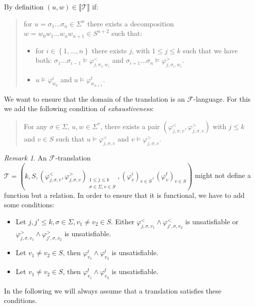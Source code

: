 \documentclass[12pt]{report}
\theoremstyle{definition}
\theoremstyle{remark}
\newtheorem{rmk}{Remark}[section]
\begin{document}
By definition $(u,w)\in\llbracket \mathcal T \rrbracket$ if:
\begin{quote}
for $u=\sigma_1\ldots \sigma_n\in \Sigma^n$ there exists a decomposition $w=w_0w_1\ldots w_nw_{n+1}\in S^{n+2}$ such that:
\begin{itemize}
\item for $i \in \left\{1,\ldots,n \right\}$ there exists $j$, with $1\leq j\leq k$ such that we have both:
$\sigma_1\ldots \sigma_{i-1}\models \varphi_{j,\sigma_i,w_i}^<$ and 
$\sigma_{i+1}\ldots \sigma_n\models \varphi_{j,\sigma_i,w_i}^>$.
\item $u\models \varphi_{w_0}^i$ and $u\models \varphi_{w_{n+1}}^t$.
\end{itemize}

\end{quote}

We want to ensure that the domain of the translation is an $\mathcal F$-language.
For this we add the following condition of \emph{exhaustiveness}:
\begin{quote}
For any $\sigma\in \Sigma$, $u,w\in \Sigma^\ast$, there exists a pair $\left(\varphi_{j,\sigma,v}^<,\varphi_{j,\sigma,v}^>\right)$ with $j\leq k$ and $v\in S$ such that $u\models \varphi_{j,\sigma,v}^<$ and $v\models \varphi_{j,\sigma,v}^>$.

\end{quote}

\begin{rmk}
An $\mathcal F$-translation $\mathcal T=\left(k,S,\left(\varphi_{j,\sigma,v}^<,\varphi_{j,\sigma,v}^>\right)_{\begin{smallmatrix} 1\leq j\leq k\\ \sigma \in \Sigma, v\in S \end{smallmatrix}},\left(\varphi_v^i\right)_{v\in S},\left(\varphi_v^t\right)_{v\in S}\right)$ might not define a function but a relation.
In order to ensure that it is functional, we have to add some conditions:
\begin{itemize}
\item Let $j,j'\leq k,\sigma\in \Sigma, v_1\neq v_2\in S$. Either $\varphi_{j,\sigma,v_1}^< \wedge \varphi_{j',\sigma,v_2}^< $ is unsatisfiable or $\varphi_{j,\sigma,v_1}^> \wedge \varphi_{j',\sigma,v_2}^> $ is unsatisfiable.
\item Let $v_1\neq v_2\in S$, then $\varphi_{v_1}^i \wedge \varphi_{v_2}^i$ is unsatisfiable.
\item Let $v_1\neq v_2\in S$, then $\varphi_{v_1}^t \wedge \varphi_{v_2}^t$ is unsatisfiable.
\end{itemize}
In the following we will always assume that a translation satisfies these conditions.
\end{rmk}
\end{document}
